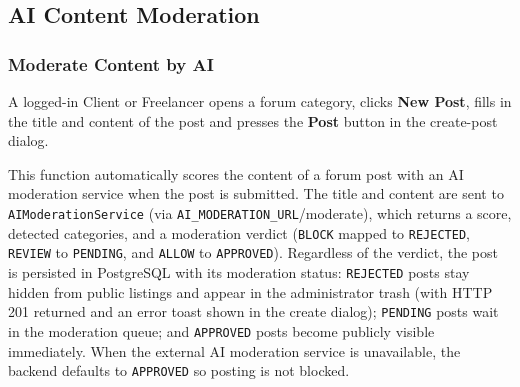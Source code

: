 

\subsection{AI Content Moderation}

\subsubsection{Moderate Content by AI}

 A logged-in Client or Freelancer opens a forum category, clicks \textbf{New Post}, fills in the title and content of the post and presses the \textbf{Post} button in the create-post dialog.

 This function automatically scores the content of a forum post with an AI moderation service when the post is submitted. The title and content are sent to \texttt{AIModerationService} (via \texttt{AI\_MODERATION\_URL}/moderate), which returns a score, detected categories, and a moderation verdict (\texttt{BLOCK} mapped to \texttt{REJECTED}, \texttt{REVIEW} to \texttt{PENDING}, and \texttt{ALLOW} to \texttt{APPROVED}). Regardless of the verdict, the post is persisted in PostgreSQL with its moderation status: \texttt{REJECTED} posts stay hidden from public listings and appear in the administrator trash (with HTTP 201 returned and an error toast shown in the create dialog); \texttt{PENDING} posts wait in the moderation queue; and \texttt{APPROVED} posts become publicly visible immediately. When the external AI moderation service is unavailable, the backend defaults to \texttt{APPROVED} so posting is not blocked.

